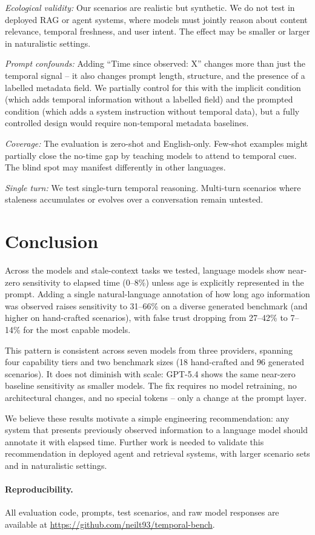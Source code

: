 \documentclass[11pt,a4paper]{article}
\begin{document}
\emph{Ecological validity:} Our scenarios are realistic but synthetic.
We do not test in deployed RAG or agent systems, where models must jointly reason about content relevance, temporal freshness, and user intent.
The effect may be smaller or larger in naturalistic settings.

\emph{Prompt confounds:} Adding ``Time since observed: X'' changes more than just the temporal signal -- it also changes prompt length, structure, and the presence of a labelled metadata field.
We partially control for this with the implicit condition (which adds temporal information without a labelled field) and the prompted condition (which adds a system instruction without temporal data), but a fully controlled design would require non-temporal metadata baselines.

\emph{Coverage:} The evaluation is zero-shot and English-only. Few-shot examples might partially close the no-time gap by teaching models to attend to temporal cues. The blind spot may manifest differently in other languages.

\emph{Single turn:} We test single-turn temporal reasoning. Multi-turn scenarios where staleness accumulates or evolves over a conversation remain untested.

\section{Conclusion}

Across the models and stale-context tasks we tested, language models show near-zero sensitivity to elapsed time (0--8\%) unless age is explicitly represented in the prompt.
Adding a single natural-language annotation of how long ago information was observed raises sensitivity to 31--66\% on a diverse generated benchmark (and higher on hand-crafted scenarios), with false trust dropping from 27--42\% to 7--14\% for the most capable models.

This pattern is consistent across seven models from three providers, spanning four capability tiers and two benchmark sizes (18 hand-crafted and 96 generated scenarios).
It does not diminish with scale: GPT-5.4 shows the same near-zero baseline sensitivity as smaller models.
The fix requires no model retraining, no architectural changes, and no special tokens -- only a change at the prompt layer.

We believe these results motivate a simple engineering recommendation: any system that presents previously observed information to a language model should annotate it with elapsed time.
Further work is needed to validate this recommendation in deployed agent and retrieval systems, with larger scenario sets and in naturalistic settings.

\paragraph{Reproducibility.}
All evaluation code, prompts, test scenarios, and raw model responses are available at \url{https://github.com/neilt93/temporal-bench}.



\end{document}
